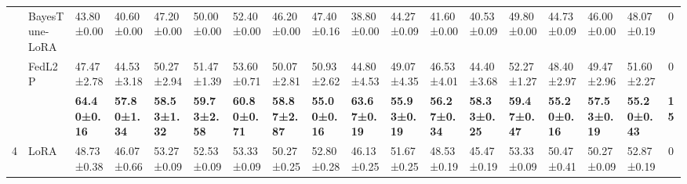 \begin{table*}[]
\begin{scriptsize}
{\begin{tabular}{c|l|l|l|l|l|l|l|l|l|l|l|l|l|l|l|l|c}
                    & BayesTune-LoRA                            & 43.80±0.00                        & 40.60±0.00                        & 47.20±0.00                        & 50.00±0.00                        & 52.40±0.00                        & 46.20±0.00                        & 47.40±0.16                        & 38.80±0.00                        & 44.27±0.09                       & 41.60±0.00                        & 40.53±0.09                       & 49.80±0.00                        & 44.73±0.09                       & 46.00±0.00                        & 48.07±0.19                       & 0             \\ %
                    & FedL2P                               & 47.47±2.78                       & 44.53±3.18                       & 50.27±2.94                       & 51.47±1.39                       & 53.60±0.71                        & 50.07±2.81                       & 50.93±2.62                       & 44.80±4.53                        & 49.07±4.35                       & 46.53±4.01                       & 44.40±3.68                        & 52.27±1.27                       & 48.40±2.97                        & 49.47±2.96                       & 51.60±2.27                        & 0             \\ %
                    & \method{}                                 & \textbf{64.40±0.16}               & \textbf{57.80±1.34}               & \textbf{58.53±1.32}              & \textbf{59.73±2.58}              & \textbf{60.80±0.71}               & \textbf{58.87±2.87}              & \textbf{55.00±0.16}               & \textbf{63.67±0.19}              & \textbf{55.93±0.19}              & \textbf{56.27±0.34}              & \textbf{58.33±0.25}              & \textbf{59.47±0.47}              & \textbf{55.20±0.16}               & \textbf{57.53±0.19}              & \textbf{55.20±0.43}               & \textbf{15}   \\ \hline
\multirow{5}{*}{4}  & LoRA                                   & 48.73±0.38                       & 46.07±0.66                       & 53.27±0.09                       & 52.53±0.09                       & 53.33±0.09                       & 50.27±0.25                       & 52.80±0.28                        & 46.13±0.25                       & 51.67±0.25                       & 48.53±0.19                       & 45.47±0.19                       & 53.33±0.09                       & 50.47±0.41                       & 50.27±0.09                       & 52.87±0.19                       & 0             \\ %

\end{tabular}}
\end{scriptsize}
\end{table*}
